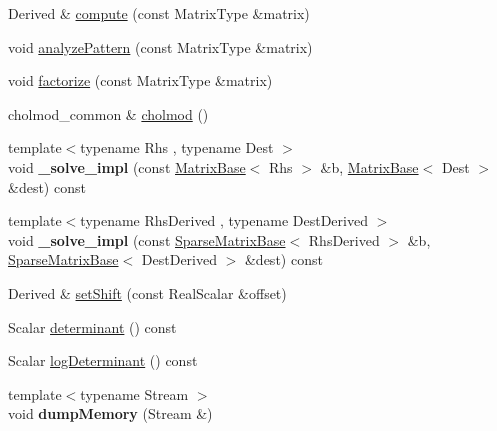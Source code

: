 \begin{DoxyCompactItemize}
Derived \& \hyperlink{class_eigen_1_1_cholmod_base_abaf5be01b1e3035a4de0b19f5b63549e}{compute} (const Matrix\+Type \&matrix)
\item 
void \hyperlink{class_eigen_1_1_cholmod_base_a5ac967e9f4ccfc43ca9e610b89232c24}{analyze\+Pattern} (const Matrix\+Type \&matrix)
\item 
void \hyperlink{class_eigen_1_1_cholmod_base_a5bd9c9ec4d1c15f202a6c66b5e9ef37b}{factorize} (const Matrix\+Type \&matrix)
\item 
cholmod\+\_\+common \& \hyperlink{class_eigen_1_1_cholmod_base_a6a85bf52d6aa480240a64f277d7f96c6}{cholmod} ()
\item 
\mbox{\label{class_eigen_1_1_cholmod_base_ad7002ebd76d3a5e6e86ab595d6cecc57}} 
{\footnotesize template$<$typename Rhs , typename Dest $>$ }\\void {\bfseries \+\_\+solve\+\_\+impl} (const \hyperlink{group___core___module_class_eigen_1_1_matrix_base}{Matrix\+Base}$<$ Rhs $>$ \&b, \hyperlink{group___core___module_class_eigen_1_1_matrix_base}{Matrix\+Base}$<$ Dest $>$ \&dest) const
\item 
\mbox{\label{class_eigen_1_1_cholmod_base_ad83e9fa24e94410bceadf0eb69793622}} 
{\footnotesize template$<$typename Rhs\+Derived , typename Dest\+Derived $>$ }\\void {\bfseries \+\_\+solve\+\_\+impl} (const \hyperlink{group___sparse_core___module_class_eigen_1_1_sparse_matrix_base}{Sparse\+Matrix\+Base}$<$ Rhs\+Derived $>$ \&b, \hyperlink{group___sparse_core___module_class_eigen_1_1_sparse_matrix_base}{Sparse\+Matrix\+Base}$<$ Dest\+Derived $>$ \&dest) const
\item 
Derived \& \hyperlink{class_eigen_1_1_cholmod_base_a886fc102723ca7bde4ac7162dfd72f5d}{set\+Shift} (const Real\+Scalar \&offset)
\item 
Scalar \hyperlink{class_eigen_1_1_cholmod_base_ab4ffb4a9735ad7e81a01d5789ce96547}{determinant} () const
\item 
Scalar \hyperlink{class_eigen_1_1_cholmod_base_a597f7839a39604af18a8741a0d8c46bf}{log\+Determinant} () const
\item 
\mbox{\label{class_eigen_1_1_cholmod_base_a1edeab014fff595aef0d8085f459253b}} 
{\footnotesize template$<$typename Stream $>$ }\\void {\bfseries dump\+Memory} (Stream \&)
\end{DoxyCompactItemize}
